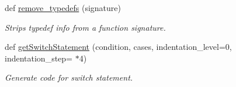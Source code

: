 \begin{DoxyCompactItemize}
def \mbox{\hyperlink{namespaceamici_1_1ode__export_abc24b0bdf0ef2b473259caa60888eeb0}{remove\+\_\+typedefs}} (signature)
\begin{DoxyCompactList}\small\item\em Strips typedef info from a function signature. \end{DoxyCompactList}\item 
def \mbox{\hyperlink{namespaceamici_1_1ode__export_a31691c711bc7cb4e3a3c32d39815ac89}{get\+Switch\+Statement}} (condition, cases, indentation\+\_\+level=0, indentation\+\_\+step=\textquotesingle{} \textquotesingle{} $\ast$4)
\begin{DoxyCompactList}\small\item\em Generate code for switch statement. \end{DoxyCompactList}\end{DoxyCompactItemize}
